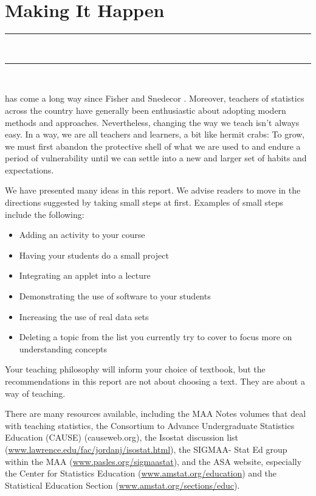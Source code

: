 \chapter{Making It Happen}
\vspace{-.53in}
   \noindent\color{graylight}\rule[0cm]{3.25in}{0.03cm} \\
    \noindent\color{graylight}\rule[0.4cm]{3.25in}{0.03cm} \\
\color{black}
\vspace{.05in}

 has come a long way since Fisher and Snedecor . Moreover, teachers of statistics across the country have generally been enthusiastic about adopting modern methods and approaches. Nevertheless, changing the way we teach isn't always easy. In a way, we are all teachers and learners, a bit like hermit crabs:  To grow, we must first abandon the protective shell of what we are used to and endure a period of vulnerability until we can settle into a new and larger set of habits and expectations. 
 
We have presented many ideas in this report.  We advise readers to move in the directions suggested by taking small steps at first.  Examples of small steps include the following:

\renewcommand{\labelitemi}{$\filledsquare$}

\begin{itemize} [leftmargin=1cm, itemsep=.2em]
\item Adding an activity to your course
\item Having your students do a small project
\item Integrating an applet into a lecture
\item Demonstrating the use of software to your students
\item Increasing the use of real data sets
\item Deleting a topic from the list you currently try to cover to focus more on understanding concepts
\end{itemize}

Your teaching philosophy will inform your choice of textbook, but the recommendations in this report are not about choosing a text.  They are about a way of teaching. 
 
There are many resources available, including the MAA Notes volumes that deal with teaching statistics, the Consortium to Advance Undergraduate Statistics Education (CAUSE) (causeweb.org), the Isostat discussion list (\url{www.lawrence.edu/fac/jordanj/isostat.html}), the SIGMAA- Stat Ed group within the MAA (\url{www.pasles.org/sigmaastat}), and the ASA website, especially the Center for Statistics Education (\url{www.amstat.org/education}) and the Statistical Education Section (\url{www.amstat.org/sections/educ}).
 
